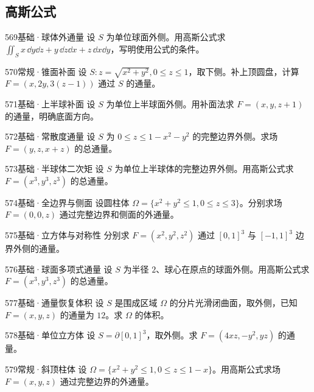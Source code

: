 \subsection{高斯公式}
\begin{exercise}{569}{基础·球体外通量}
设 $S$ 为单位球面外侧。用高斯公式求 $\iint_Sx\,\dd y\dd z+y\,\dd z\dd x+z\,\dd x\dd y$，写明使用公式的条件。
\end{exercise}
\begin{exercise}{570}{常规·锥面补面}
设 $S:z=\sqrt{x^2+y^2},0\leq z\leq1$，取下侧。补上顶圆盘，计算 $F=(x,2y,3(z-1))$ 通过 $S$ 的通量。
\end{exercise}
\begin{exercise}{571}{基础·上半球补面}
设 $S$ 为单位上半球面外侧。用补面法求 $F=(x,y,z+1)$ 的通量，明确底面方向。
\end{exercise}
\begin{exercise}{572}{基础·常散度通量}
设 $S$ 为 $0\leq z\leq1-x^2-y^2$ 的完整边界外侧。求场 $F=(y,z,x+z)$ 的总通量。
\end{exercise}
\begin{exercise}{573}{基础·半球体二次矩}
设 $S$ 为单位上半球体的完整边界外侧。用高斯公式求 $F=(x^3,y^3,z^3)$ 的总通量。
\end{exercise}
\begin{exercise}{574}{基础·全边界与侧面}
设圆柱体 $\Omega=\{x^2+y^2\leq1,0\leq z\leq3\}$。分别求场 $F=(0,0,z)$ 通过完整边界和侧面的外通量。
\end{exercise}
\begin{exercise}{575}{基础·立方体与对称性}
分别求 $F=(x^2,y^2,z^2)$ 通过 $[0,1]^3$ 与 $[-1,1]^3$ 边界外侧的通量。
\end{exercise}
\begin{exercise}{576}{基础·球面多项式通量}
设 $S$ 为半径 $2$、球心在原点的球面外侧。用高斯公式求 $F=(x^3,y^3,z^3)$ 的总通量。
\end{exercise}
\begin{exercise}{577}{基础·通量恢复体积}
设 $S$ 是围成区域 $\Omega$ 的分片光滑闭曲面，取外侧，已知 $F=(x,y,z)$ 的通量为 $12$。求 $\Omega$ 的体积。
\end{exercise}
\begin{exercise}{578}{基础·单位立方体}
设 $S=\partial[0,1]^3$，取外侧。求 $F=(4xz,-y^2,yz)$ 的通量。
\end{exercise}
\begin{exercise}{579}{常规·斜顶柱体}
设 $\Omega=\{x^2+y^2\leq1,0\leq z\leq1-x\}$。用高斯公式求场 $F=(x,y,z)$ 通过完整边界的外通量。
\end{exercise}

